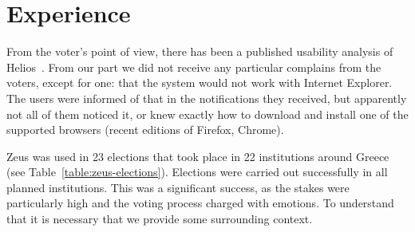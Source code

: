 \documentclass[letterpaper,twocolumn,10pt]{article}
\begin{document}






\section{Experience}

From the voter's point of view, there has been a published usability
analysis of Helios~\cite{karayumak:2011}. From our part we did not
receive any particular complains from the voters, except for one: that
the system would not work with Internet Explorer. The users were
informed of that in the notifications they received, but apparently
not all of them noticed it, or knew exactly how to download and
install one of the supported browsers (recent editions of Firefox,
Chrome).

Zeus was used in 23 elections that took place in 22 institutions
around Greece (see Table~\ref{table:zeus-elections}). Elections were
carried out successfully in all planned institutions. This was a
significant success, as the stakes were particularly high and the
voting process charged with emotions. To understand that it is
necessary that we provide some surrounding context.
\end{document}
